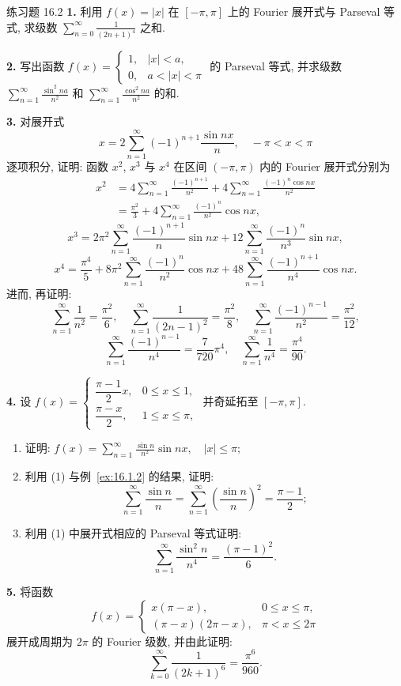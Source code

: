 \begin{exblock}{练习题 16.2}
\textbf{1.} 利用 $f(x) = |x|$ 在 $[-\pi, \pi]$ 上的 Fourier 展开式与 Parseval 等式, 求级数 $\sum_{n=0}^{\infty} \frac{1}{(2n+1)^4}$ 之和.

\textbf{2.} 写出函数 $f(x)=\begin{cases}1,&|x|<a,\\0,&a<|x|<\pi\end{cases}$ 的 Parseval 等式, 并求级数 $\sum_{n=1}^{\infty}\frac{\sin^{2}na}{n^{2}}$ 和 $\sum_{n=1}^{\infty}\frac{\cos^{2}na}{n^{2}}$ 的和.

\textbf{3.} 对展开式
\[
  x=2\sum_{n=1}^{\infty}(-1)^{n+1}\frac{\sin n x}{n},\quad-\pi<x<\pi
\]
逐项积分, 证明: 函数 $x^{2}$, $x^{3}$ 与 $x^{4}$ 在区间 $(-\pi, \pi)$ 内的 Fourier 展开式分别为
\[
  \begin{aligned}
    x^{2}&=4\sum_{n=1}^{\infty}\frac{(-1)^{n+1}}{n^{2}}+4\sum_{n=1}^{\infty}\frac{(-1)^{n}\cos nx}{n^{2}}\\&=\frac{\pi^{2}}{3}+4\sum_{n=1}^{\infty}\frac{(-1)^{n}}{n^{2}}\cos nx,
  \end{aligned}
\]
\[
  x^{3}=2\pi^{2}\sum_{n=1}^{\infty}\frac{(-1)^{n+1}}{n}\sin n x+12\sum_{n=1}^{\infty}\frac{(-1)^{n}}{n^{3}}\sin n x,
\]
\[
  x^{4}=\frac{\pi^{4}}{5}+8\pi^2\sum_{n=1}^{\infty}\frac{(-1)^{n}}{n^{2}}\cos nx+48\sum_{n=1}^{\infty}\frac{(-1)^{n+1}}{n^{4}}\cos nx.
\]
进而, 再证明:
\[
  \sum_{n=1}^{\infty}\frac{1}{n^{2}}=\frac{\pi^{2}}{6},\quad\sum_{n=1}^{\infty}\frac{1}{(2n-1)^{2}}=\frac{\pi^{2}}{8},\quad\sum_{n=1}^{\infty}\frac{(-1)^{n-1}}{n^{2}}=\frac{\pi^{2}}{12},
\]
\[
  \sum_{n=1}^{\infty}\frac{(-1)^{n-1}}{n^{4}}=\frac{7}{720}\pi^{4},\quad\sum_{n=1}^{\infty}\frac{1}{n^{4}}=\frac{\pi^{4}}{90}.
\]

\textbf{4.} 设 $f(x)=\begin{cases}\dfrac{\pi-1}{2}x,&0\leqslant x\leqslant1,\\[
6pt]\dfrac{\pi-x}{2},&1\leqslant x\leqslant\pi,\end{cases}$ 并奇延拓至 $[-\pi,\pi]$.
\begin{enumerate}
  \item 证明: $f(x)=\sum_{n=1}^{\infty}\frac{\sin n}{n^{2}}\sin nx,\quad|x|\leqslant\pi;$
  \item 利用 (1) 与例~\ref{ex:16.1.2} 的结果, 证明:
  \[
    \sum_{n=1}^{\infty}\frac{\sin n}{n}=\sum_{n=1}^{\infty}\left(\frac{\sin n}{n}\right)^{2}=\frac{\pi-1}{2};
\]
  \item 利用 (1) 中展开式相应的 Parseval 等式证明:
  \[
    \sum_{n=1}^{\infty}\frac{\sin^{2}n}{n^{4}}=\frac{(\pi-1)^{2}}{6}.
\]
\end{enumerate}

\textbf{5.} 将函数
\[
  f(x)=\begin{cases}
    x(\pi-x), & 0\leqslant x\leqslant\pi,\\
    (\pi-x)(2\pi-x), & \pi<x\leqslant2\pi
\end{cases}
\]
展开成周期为 $2\pi$ 的 Fourier 级数, 并由此证明:
\[
  \sum_{k=0}^{\infty}\frac{1}{(2k+1)^6}=\frac{\pi^6}{960}.
\]
\end{exblock}


